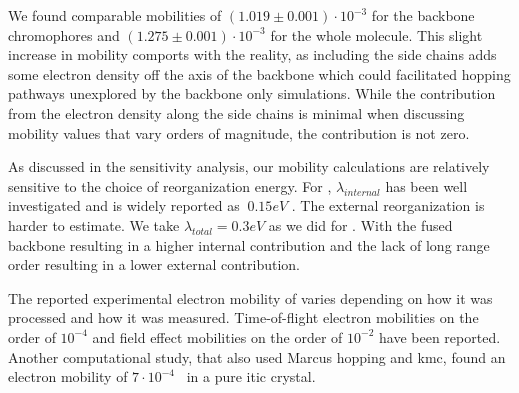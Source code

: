 We found comparable mobilities of $(1.019 \pm 0.001)\cdot 10^{-3}$ for the backbone chromophores and 
$(1.275 \pm 0.001)\cdot 10^{-3}$ for the whole molecule. This slight increase in
mobility comports with the reality, as including the side chains adds some
electron density off the axis of the backbone which could facilitated hopping
pathways unexplored by the backbone only simulations. While the contribution
from the electron density along the side chains is minimal when discussing
mobility values that vary orders of magnitude, the contribution is not zero.


As discussed in the sensitivity analysis, our mobility calculations are relatively sensitive to the choice of
reorganization energy. For , $\lambda_{internal}$ has been well investigated and is widely reported as
$~0.15eV$ \cite{Han2019}. The external reorganization is harder to estimate. We take $\lambda_{total}=0.3eV$ as we did for
. With the fused
backbone resulting in a higher internal contribution and the lack of long range order resulting in a lower
external contribution. 

The reported experimental electron mobility of  varies depending on how it was processed and how it was measured. 
Time-of-flight electron mobilities on the order of $10^{-4}$ \cite{Mica2018} and field effect mobilities on the order of
$10^{-2}$ \cite{Park2018} have been reported. Another computational study, that also used Marcus hopping and
\gls{kmc}, found an electron mobility of $7\cdot10^{-4}$~\cite{Han2017b} in a pure \gls{itic} crystal.

